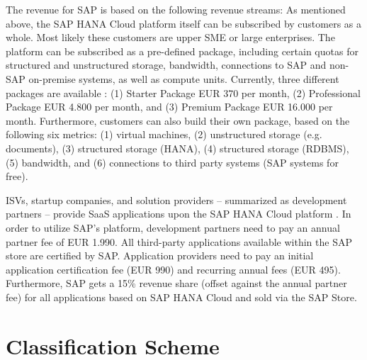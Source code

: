 The revenue for SAP is based on the following revenue streams: As mentioned above, the SAP HANA Cloud platform itself can be subscribed by customers as a whole. Most likely these customers are upper \ac{SME} or large enterprises. The platform can be subscribed as a pre-defined package, including certain quotas for structured and unstructured storage, bandwidth, connections to SAP and non-SAP on-premise systems, as well as compute units. Currently, three different packages are available \citep{SAP2013b}: (1) Starter Package \ac{EUR} 370 per month, (2) Professional Package \ac{EUR} 4.800 per month, and (3) Premium Package \ac{EUR} 16.000 per month. Furthermore, customers can also build their own package, based on the following six metrics: (1) virtual machines, (2) unstructured storage (e.g. documents), (3) structured storage (HANA), (4) structured storage (RDBMS), (5) bandwidth, and (6) connections to third party systems (SAP systems for free). 

\acp{ISV}, startup companies, and solution providers -- summarized as development partners -- provide \ac{SaaS} applications upon the SAP HANA Cloud platform \citep{SAP2013a}. In order to utilize SAP's platform, development partners need to pay an annual partner fee of \ac{EUR} 1.990. All third-party applications available within the SAP store are certified by SAP. Application providers need to pay an initial application certification fee (\ac{EUR} 990) and recurring annual fees (\ac{EUR} 495). Furthermore, SAP gets a 15\% revenue share (offset against the annual partner fee) for all applications based on SAP HANA Cloud and sold via the SAP Store.




\section{Classification Scheme}\label{ch:sota:cm}

